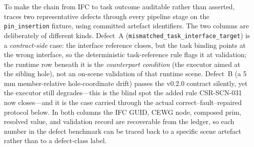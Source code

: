 To make the chain from IFC to task outcome auditable rather than asserted,
 traces two representative defects through every
pipeline stage on the \texttt{pin\_insertion} fixture, using committed
artefact identifiers. The two columns are deliberately of different kinds.
Defect~A (\texttt{mismatched\_task\_interface\_target}) is a
\emph{contract-side} case: the interface reference closes, but the task
binding points at the wrong interface, so the deterministic task-reference
rule flags it at validation; the runtime row beneath it is the
\emph{counterpart condition} (the executor aimed at the sibling hole), not
an on-scene validation of that runtime scene. Defect~B (a 5\,mm
member-relative hole-coordinate drift) passes the v0.2.0 contract silently,
yet the executor still degrades---this is the blind spot the added rule
CSR-SCN-031 now closes---and it is the case carried through the actual
correct--fault--repaired protocol below. In both columns the IFC GUID, CEWG
node, composed prim, resolved value, and validation record are recoverable
from the ledger, so each number in the defect benchmark can be traced back
to a specific scene artefact rather than to a defect-class label.


